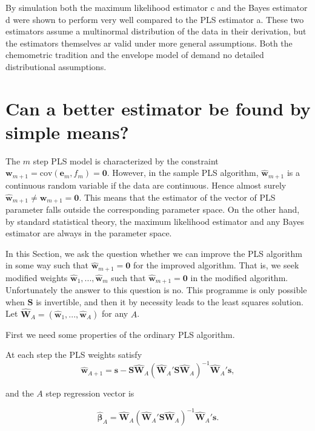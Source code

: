 \documentclass[num-refs]{wiley-article}
\begin{document}
By simulation both the maximum likelihood estimator c and the Bayes estimator d were shown to perform very well compared to the PLS estimator a. These two estimators assume a multinormal distribution of the data in their derivation, but the estimators themselves ar valid under more general assumptions. Both the chemometric tradition and the envelope model of \citet{cook2010envelope, cook2013envelopes} demand no detailed distributional assumptions.

\section{Can a better estimator be found by simple means?}

The $m$ step PLS model is characterized by the constraint $\bm{w}_{m+1}=\mathrm{cov}(\bm{e}_m ,f_m)=\bm{0}$. However, in the sample PLS algorithm, $\widehat{\bm{w}}_{m+1}$ is a continuous random variable if the data are continuous. Hence almost surely $\widehat{\bm{w}}_{m+1}\ne\bm{w}_{m+1}=\bm{0}$. This means that the estimator of the vector of PLS parameter falls outside the corresponding parameter space. On the other hand, by standard statistical theory, the maximum likelihood estimator and any Bayes estimator are always in the parameter space.

In this Section, we ask the question whether we can improve the PLS algorithm in some way such that $\widehat{\bm{w}}_{m+1}=\bm{0}$ for the improved algorithm. That is, we seek modified weights $\widehat{\bm{w}}_{1},...,\widehat{\bm{w}}_{m}$ such that $\widehat{\bm{w}}_{m+1}=\bm{0}$ in the modified algorithm. Unfortunately the answer to this question is no. This programme is only possible when $\bm{S}$ is invertible, and then it by necessity leads to the least squares solution. Let $\widehat{\bm{W}}_A=(\widehat{\bm{w}}_1,...,\widehat{\bm{w}}_A)$ for any $A$.

First we need some properties of the ordinary PLS algorithm.
\bigskip

\begin{proposition}
  At each step the PLS weights satisfy
  \begin{equation}
    \widehat{\bm{w}}_{A+1} =
    \bm{s}-\bm{S}\widehat{\bm{W}}_{A}
    (\widehat{\bm{W}}_{A}'\bm{S}\widehat{\bm{W}}_{A})^{-1}
    \widehat{\bm{W}}_{A}'\bm{s},
    \label{weight}
  \end{equation}

  and the $A$ step regression vector is

  \begin{equation}
    \widehat{\bm{\beta}}_{A} =
    \widehat{\bm{W}}_{A}
    (\widehat{\bm{W}}_{A}'\bm{S}\widehat{\bm{W}}_{A})^{-1}
    \widehat{\bm{W}}_{A}'\bm{s}.
    \label{regression}
  \end{equation}
\end{proposition}
\end{document}
